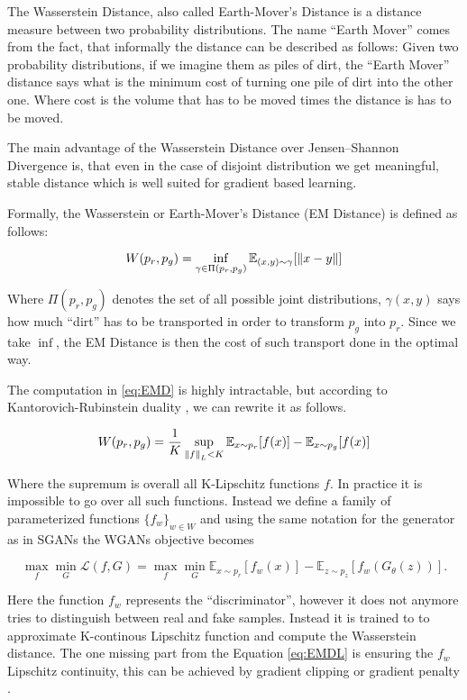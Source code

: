 The Wasserstein Distance, also called Earth-Mover's Distance is a distance
measure between two probability distributions. The name ``Earth Mover'' comes
from the fact, that informally the distance can be described as follows: Given
two probability distributions, if we imagine them as piles of dirt, the ``Earth
Mover'' distance says what is the minimum cost of turning one pile of dirt into the
other one. Where cost is the volume that has to be moved times the distance is
has to be moved.

The main advantage of the Wasserstein Distance over Jensen–Shannon Divergence is,
that even in the case of disjoint distribution we get meaningful, stable
distance which is well suited for gradient based learning.

Formally, the Wasserstein or Earth-Mover's Distance (EM Distance) is defined as
follows:

\begin{equation}
  \label{eq:EMD}
  W(p_r, p_g) = \inf_{\gamma \in \Pi(p_r, p_g)} \mathbb{E}_{(x, y) \sim \gamma}[\left\lVert x-y\right\rVert]
\end{equation}

Where $\Pi(p_r, p_g)$ denotes the set of all possible joint distributions,
$\gamma(x,y)$ says how much ``dirt'' has to be transported in order to transform
$p_g$ into $p_r$. Since we take $\inf$, the EM Distance is then the cost of such
transport done in the optimal way. 

The computation in \ref{eq:EMD} is highly intractable, but according to
Kantorovich-Rubinstein duality \cite{villani@optimal}, we can rewrite it as
follows.

\begin{equation}
  \label{eq:EMD2}
  W(p_r, p_g) = \frac{1}{K} \sup_{\left\lVert f\right\rVert_L < K} \mathbb{E}_{x \sim p_r}[f(x)] - \mathbb{E}_{x \sim p_g}[f(x)]
\end{equation}

Where the supremum is overall all K-Lipschitz functions $f$. In practice it is
impossible to go over all such functions. Instead we define a family of parameterized
functions $\{f_{w}\}_{w \in W}$ and using the same notation for the generator as
in SGANs the WGANs objective becomes


\begin{equation}
  \label{eq:EMDL}
  \max_{f}\min_{G}\mathcal{L}(f, G) = \max_{f}\min_{G}  \mathbb{E}_{x \sim p_r}[f_w(x)] - \mathbb{E}_{z \sim p_z}[f_w(G_{\theta}(z))].
\end{equation}

Here the function $f_w$ represents the ``discriminator'', however it does not
anymore tries to distinguish between real and fake samples. Instead it is
trained to to approximate K-continous Lipschitz function and compute the
Wasserstein distance. The one missing part from the Equation \ref{eq:EMDL} is
ensuring the $f_w$ Lipschitz continuity, this can be achieved by gradient
clipping \cite{arjovsky2017wasserstein} or gradient penalty \cite{gulrajani2017improved}.

